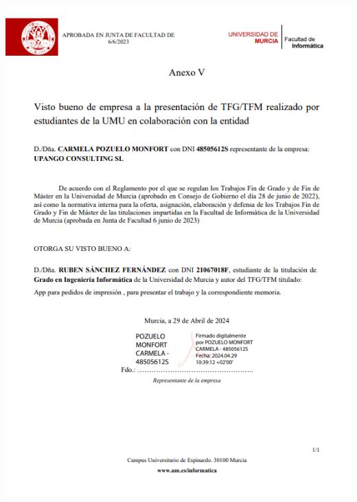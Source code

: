 \documentclass[11pt]{article}
\begin{document}
\fontsize{10pt}{12pt}\selectfont

\pagestyle{empty}
\setcounter{page}{1}
\part*{}
\tableofcontents
\newpage
\listoffigures
\listoftables
\newpage
\clearpage
\pagestyle{fancy}

% 
\includegraphics[width=1\textwidth]{Anexo_Firmado_Upango.png}

\clearpage
\end{document}
